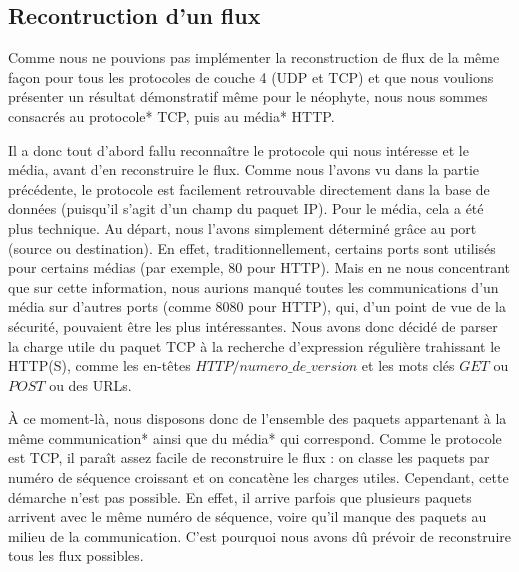 \subsection{Recontruction d'un flux}

Comme nous ne pouvions pas implémenter la reconstruction de flux de la même façon pour tous les protocoles de couche 4 (UDP et TCP) et
que nous voulions présenter un résultat démonstratif même pour le néophyte, nous nous sommes consacrés au protocole* TCP, puis au média* HTTP.


\indent Il a donc tout d'abord fallu reconnaître le protocole qui nous intéresse et le média, avant d'en reconstruire le flux. Comme nous l'avons vu 
dans la partie précédente, le protocole est facilement retrouvable directement dans la base de données (puisqu'il s'agit d'un champ du paquet IP). 
Pour le média, cela a été plus technique. Au départ, nous l'avons simplement déterminé grâce au port (source ou destination). En effet, traditionnellement,
certains ports sont utilisés pour certains médias (par exemple, 80 pour HTTP). Mais en ne nous concentrant que sur cette information, nous aurions manqué
toutes les communications d'un média sur d'autres ports (comme 8080 pour HTTP), qui, d'un point de vue de la sécurité, pouvaient être les plus intéressantes.
Nous avons donc décidé de parser la charge utile du paquet TCP à la recherche d'expression régulière trahissant le HTTP(S), comme les en-têtes
 $HTTP/numero\_de\_version$ et les mots clés $GET$ ou $POST$ ou des URLs.


\indent À ce moment-là, nous disposons donc de l'ensemble des paquets appartenant à la même communication* ainsi que du média* qui correspond. Comme le protocole est TCP,
il paraît assez facile de reconstruire le flux : on classe les paquets par numéro de séquence croissant et on concatène les charges utiles. Cependant, cette démarche 
n'est pas possible. En effet, il arrive parfois que plusieurs paquets arrivent avec le même numéro de séquence, voire qu'il manque des paquets au milieu de la communication.
C'est pourquoi nous avons dû prévoir de reconstruire tous les flux possibles.


